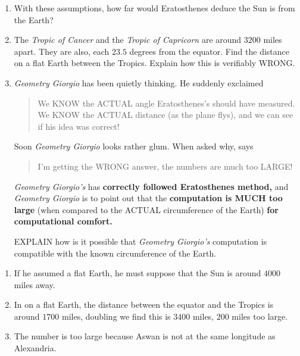 \documentclass[noauthor,nooutcomes,handout]{ximera}
\begin{document}
\begin{question}
\begin{center}
\begin{tikzpicture}[geometryDiagrams,scale=1.5]
      \end{tikzpicture}
  \end{center}
  \begin{enumerate}
  \item With these assumptions, how far would Eratosthenes deduce the
    Sun is from the Earth?
  \item The \textit{Tropic of Cancer} and the \textit{Tropic of
    Capricorn} are around $3200$ miles apart. They are also, each
    $23.5$ degrees from the equator.  Find the distance on a flat
    Earth between the Tropics. Explain how this is verifiably WRONG.
  \item \textit{Geometry Giorgio} has been quietly thinking. He suddenly
  exclaimed
  \begin{quote}
    We KNOW the ACTUAL angle Eratosthenes's should have measured. We
    KNOW the ACTUAL distance (as the plane flys), and we can see if
    his idea was correct!
  \end{quote}
  Soon \textit{Geometry Giorgio} looks rather glum. When asked why,
  says
  \begin{quote}
    I'm getting the WRONG answer, the numbers are much too LARGE!
  \end{quote}
  \textit{Geometry Giorgio's} has \textbf{correctly followed Eratosthenes
  method,} and \textit{Geometry Giorgio} is  to point out that
  the \textbf{computation is MUCH too large} (when compared to the ACTUAL
  circumference of the Earth) \textbf{for computational comfort.}

  EXPLAIN how is it possible that \textit{Geometry Giorgio's}
  computation is compatible with the known circumference of the Earth.
  \end{enumerate}
  \begin{freeResponse}
    \begin{enumerate}
      \item If he assumed a flat Earth, he must suppose that the Sun
        is around $4000$ miles away.
      \item In on a flat Earth, the distance between the equator and
        the Tropics is around $1700$ miles, doubling we find this is
        $3400$ miles, $200$ miles too large.
      \item The number is too large because Aswan is not at the same
        longitude as Alexandria.
    \end{enumerate}
  \end{freeResponse}
\end{question}
\mynewpage
\end{document}
